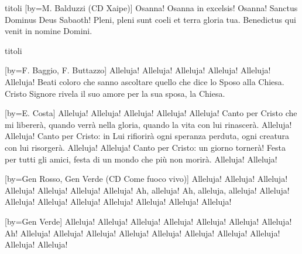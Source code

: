 \begin{songs}{titoli}
[by={M. Balduzzi (CD Xaipe)}]
\beginchorus
Osanna! Osanna in excelsis! Osanna!
\endchorus
\beginverse*
Sanctus Dominus Deus Sabaoth! 
Pleni, pleni sunt coeli et terra 
gloria tua.
\endverse
\beginverse*
Benedictus qui venit 
in nomine Domini.
\endverse
\endsong

\end{songs}

\begin{songs}{titoli}

[by={F. Baggio, F. Buttazzo}]
\beginchorus
Alleluja! Alleluja! Alleluja! Alleluja! Alleluja! Alleluja! 
\endchorus
\beginverse
Beati coloro che sanno ascoltare quello che dice lo Sposo alla Chiesa.
Cristo Signore rivela il suo amore per la sua sposa, la Chiesa.
\endverse
\endsong

[by={E. Costa}]
\beginchorus
Alleluja! Alleluja! Alleluja! Alleluja! Alleluja! 
\endchorus
\beginverse
Canto per Cristo che mi libererà, quando verrà nella gloria,
quando la vita con lui rinascerà. Alleluja! Alleluja!
\endverse
\beginverse
Canto per Cristo: in Lui rifiorirà ogni speranza perduta,
ogni creatura con lui risorgerà. Alleluja! Alleluja!
\endverse
\beginverse
Canto per Cristo: un giorno tornerà! Festa per tutti gli amici,
festa di un mondo che più non morirà. Alleluja! Alleluja!
\endverse
\endsong

[by={Gen Rosso, Gen Verde (CD Come fuoco vivo)}]
\beginverse*
Alleluja! Alleluja! Alleluja!
Alleluja! Alleluja! Alleluja! Alleluja!
Ah, alleluja! Ah, alleluja, alleluja!
Alleluja! Alleluja! Alleluja!
Alleluja! Alleluja! Alleluja! Alleluja! Alleluja!
\endverse
\endsong

[by={Gen Verde}]
\beginverse*
Alleluja! Alleluja! Alleluja! Alleluja! 
Alleluja! Alleluja! Alleluja! Ah!
Alleluja! Alleluja! Alleluja! Alleluja! Alleluja! Alleluja!
Alleluja! Alleluja! Alleluja! Alleluja! 
\endverse
\endsong


\end{songs}
